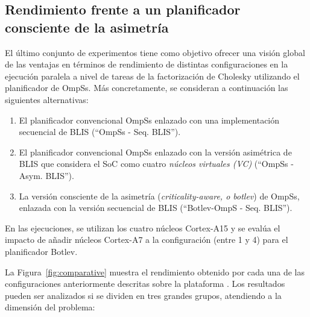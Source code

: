 \subsection{Rendimiento frente a un planificador consciente de la asimetría}
\label{sec:comparative}

El último conjunto de experimentos tiene como objetivo ofrecer una visión global de las ventajas en términos
de rendimiento de distintas configuraciones en la ejecución paralela a nivel de tareas de la factorización de
Cholesky utilizando el planificador de OmpSs. Más concretamente, se consideran a continuación las siguientes
alternativas:

\begin{enumerate}
\item El planificador convencional OmpSs enlazado con una implementación
  secuencial de BLIS (``OmpSs - Seq. BLIS'').
\item El planificador convencional OmpSs enlazado con la versión asimétrica
  de BLIS que considera el SoC como cuatro {\em núcleos virtuales (VC)}
  (``OmpSs - Asym. BLIS'').
\item La versión consciente de la asimetría ({\em criticality-aware, o
    botlev}) de OmpSs, enlazada con la versión secuencial de BLIS
  (``Botlev-OmpS - Seq. BLIS'').

\end{enumerate}

En las ejecuciones, se utilizan los cuatro núcleos Cortex-A15 y se evalúa el impacto de añadir núcleos 
Cortex-A7 a la configuración (entre 1 y 4) para el planificador Botlev.


La Figura~\ref{fig:comparative} muestra el rendimiento obtenido por cada una de las configuraciones
anteriormente descritas sobre la plataforma \odroid. Los resultados pueden ser analizados si se dividen 
en tres grandes grupos, atendiendo a la dimensión del problema:


